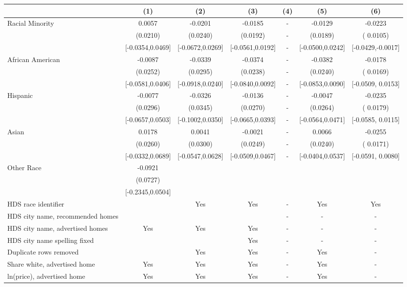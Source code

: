 \begin{table}[htbp]
{\begin{tabular}{l*{6}{c}}
                    &\multicolumn{1}{c}{(1)}   &\multicolumn{1}{c}{(2)}   &\multicolumn{1}{c}{(3)}   &\multicolumn{1}{c}{(4)}   &\multicolumn{1}{c}{(5)}   &\multicolumn{1}{c}{(6)}\\
\midrule
Racial Minority & 0.0057 & -0.0201 & -0.0185 & - & -0.0129 & -0.0223\sym{**} \\
 & (0.0210) & (0.0240) & (0.0192) & - & (0.0189) & ( 0.0105) \\
 & [-0.0354,0.0469] & [-0.0672,0.0269] & [-0.0561,0.0192] & - & [-0.0500,0.0242] & [-0.0429,-0.0017] \\
\midrule
African American & -0.0087 & -0.0339 & -0.0374 & - & -0.0382 & -0.0178 \\
 & (0.0252) & (0.0295) & (0.0238) & - & (0.0240) & ( 0.0169) \\
 & [-0.0581,0.0406] & [-0.0918,0.0240] & [-0.0840,0.0092] & - & [-0.0853,0.0090] & [-0.0509, 0.0153] \\
Hispanic & -0.0077 & -0.0326 & -0.0136 & - & -0.0047 & -0.0235 \\
 & (0.0296) & (0.0345) & (0.0270) & - & (0.0264) & ( 0.0179) \\
 & [-0.0657,0.0503] & [-0.1002,0.0350] & [-0.0665,0.0393] & - & [-0.0564,0.0471] & [-0.0585, 0.0115] \\
Asian & 0.0178 & 0.0041 & -0.0021 & - & 0.0066 & -0.0255 \\
 & (0.0260) & (0.0300) & (0.0249) & - & (0.0240) & ( 0.0171) \\
 & [-0.0332,0.0689] & [-0.0547,0.0628] & [-0.0509,0.0467] & - & [-0.0404,0.0537] & [-0.0591, 0.0080] \\
Other Race & -0.0921 &  &  &  &  &  \\
 & (0.0727) &  &  &  &  &  \\
 & [-0.2345,0.0504] &  &  &  &  &  \\
\midrule
HDS race identifier & & Yes & Yes & - & Yes & Yes \\
HDS city name, recommended homes &  &  &  &- & - & -\\
HDS city name, advertised homes & Yes & Yes & Yes & - & - & -\\
HDS city name spelling fixed & & & Yes & - & - & -\\
Duplicate rows removed &  & Yes & Yes & - & Yes & - \\
\midrule
Share white, advertised home  & Yes & Yes & Yes & - & Yes & - \\
ln(price), advertised home  & Yes & Yes & Yes & - & Yes & - \\

\end{tabular}}
\end{table}
